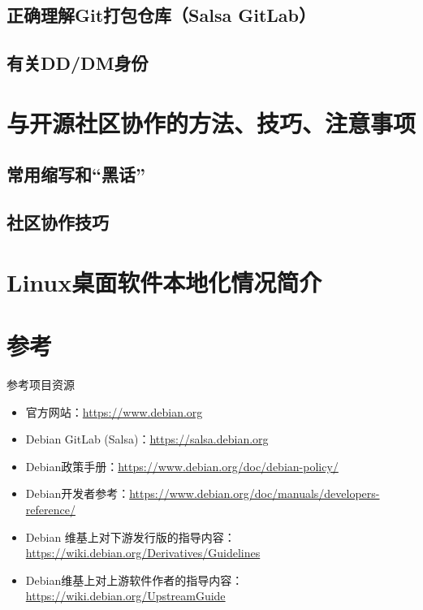 \documentclass[aspectratio=169]{beamer}
\begin{document}


\subsection{正确理解Git打包仓库（Salsa GitLab）}



\subsection{有关DD/DM身份}


\section{与开源社区协作的方法、技巧、注意事项}

\subsection{常用缩写和“黑话”}


\subsection{社区协作技巧}


\section{Linux桌面软件本地化情况简介}



\section*{参考}
\begin{frame}[t]{参考}{项目资源}
\begin{itemize}
\item 官方网站：\url{https://www.debian.org}
\item Debian GitLab (Salsa)：\url{https://salsa.debian.org}
\item Debian政策手册：\url{https://www.debian.org/doc/debian-policy/}
\item Debian开发者参考：\url{https://www.debian.org/doc/manuals/developers-reference/}
\item Debian 维基上对下游发行版的指导内容：\url{https://wiki.debian.org/Derivatives/Guidelines}
\item Debian维基上对上游软件作者的指导内容：\url{https://wiki.debian.org/UpstreamGuide}
\end{itemize}
\end{frame}
\end{document}
